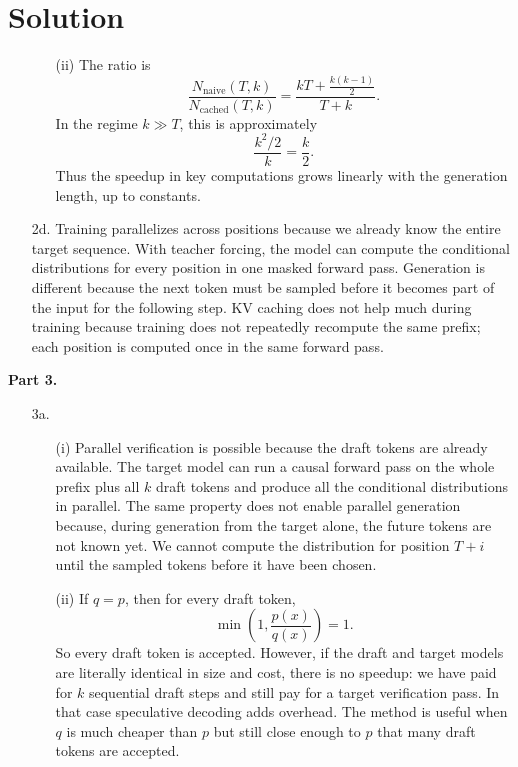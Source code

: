 \documentclass[submit]{harvardml}
\newenvironment{solution}
  {\color{blue}\section*{Solution}}
{}
\begin{document}
\begin{solution}
\begin{enumerate}
\begin{enumerate}
        \item[(ii)] The ratio is
        \[
        \frac{N_{\text{naive}}(T,k)}{N_{\text{cached}}(T,k)}
        =\frac{kT+\frac{k(k-1)}{2}}{T+k}.
        \]
        In the regime $k\gg T$, this is approximately
        \[
        \frac{k^2/2}{k}=\frac{k}{2}.
        \]
        Thus the speedup in key computations grows linearly with the generation length, up to constants.
    \end{enumerate}

    \item[2d.] Training parallelizes across positions because we already know the entire target sequence. With teacher forcing, the model can compute the conditional distributions for every position in one masked forward pass. Generation is different because the next token must be sampled before it becomes part of the input for the following step. KV caching does not help much during training because training does not repeatedly recompute the same prefix; each position is computed once in the same forward pass.
\end{enumerate}

\textbf{Part 3.}

\begin{enumerate}
    \item[3a.]
    \begin{enumerate}
        \item[(i)] Parallel verification is possible because the draft tokens are already available. The target model can run a causal forward pass on the whole prefix plus all $k$ draft tokens and produce all the conditional distributions in parallel. The same property does not enable parallel generation because, during generation from the target alone, the future tokens are not known yet. We cannot compute the distribution for position $T+i$ until the sampled tokens before it have been chosen.

        \item[(ii)] If $q=p$, then for every draft token,
        \[
        \min\left(1,\frac{p(x)}{q(x)}\right)=1.
        \]
        So every draft token is accepted. However, if the draft and target models are literally identical in size and cost, there is no speedup: we have paid for $k$ sequential draft steps and still pay for a target verification pass. In that case speculative decoding adds overhead. The method is useful when $q$ is much cheaper than $p$ but still close enough to $p$ that many draft tokens are accepted.
    \end{enumerate}


\end{enumerate}
\end{solution}
\end{document}
